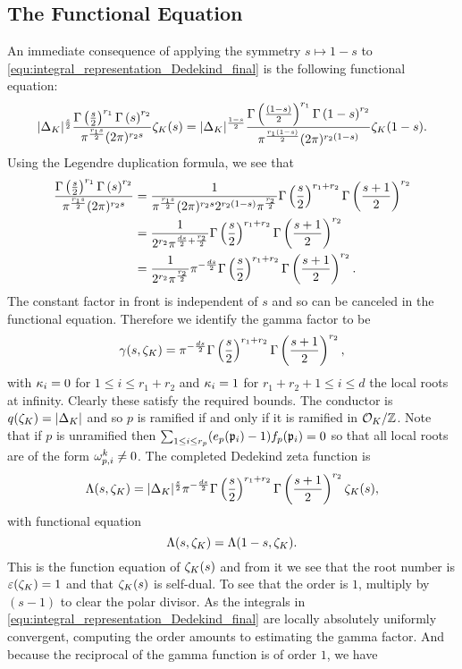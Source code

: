     \subsection*{The Functional Equation}
      An immediate consequence of applying the symmetry $s \mapsto 1-s$ to \cref{equ:integral_representation_Dedekind_final} is the following functional equation:
      \[
        |\Delta_{K}|^{\frac{s}{2}}\frac{\Gamma\left(\frac{s}{2}\right)^{r_{1}}\Gamma\left(s\right)^{r_{2}}}{\pi^{\frac{r_{1}s}{2}}(2\pi)^{r_{2}s}}\zeta_{K}(s) = |\Delta_{K}|^{\frac{1-s}{2}}\frac{\Gamma\left(\frac{(1-s)}{2}\right)^{r_{1}}\Gamma\left(1-s\right)^{r_{2}}}{\pi^{\frac{r_{1}(1-s)}{2}}(2\pi)^{r_{2}(1-s)}}\zeta_{K}(1-s).
      \]
      Using the Legendre duplication formula, we see that
      \begin{align*}
        \frac{\Gamma\left(\frac{s}{2}\right)^{r_{1}}\Gamma\left(s\right)^{r_{2}}}{\pi^{\frac{r_{1}s}{2}}(2\pi)^{r_{2}s}} &= \frac{1}{\pi^{\frac{r_{1}s}{2}}(2\pi)^{r_{2}s}2^{r_{2}(1-s)}\pi^{\frac{r_{2}}{2}}}\Gamma\left(\frac{s}{2}\right)^{r_{1}+r_{2}}\Gamma\left(\frac{s+1}{2}\right)^{r_{2}} \\
        &= \frac{1}{2^{r_{2}}\pi^{\frac{ds}{2}+\frac{r_{2}}{2}}}\Gamma\left(\frac{s}{2}\right)^{r_{1}+r_{2}}\Gamma\left(\frac{s+1}{2}\right)^{r_{2}} \\
        &= \frac{1}{2^{r_{2}}\pi^{\frac{r_{2}}{2}}}\pi^{-\frac{ds}{2}}\Gamma\left(\frac{s}{2}\right)^{r_{1}+r_{2}}\Gamma\left(\frac{s+1}{2}\right)^{r_{2}}.
      \end{align*}
      The constant factor in front is independent of $s$ and so can be canceled in the functional equation. Therefore we identify the gamma factor to be
      \[
        \gamma(s,\zeta_{K}) = \pi^{-\frac{ds}{2}}\Gamma\left(\frac{s}{2}\right)^{r_{1}+r_{2}}\Gamma\left(\frac{s+1}{2}\right)^{r_{2}},
      \]
      with $\kappa_{i} = 0$ for $1 \le i \le r_{1}+r_{2}$ and $\kappa_{i} = 1$ for $r_{1}+r_{2}+1 \le i \le d$ the local roots at infinity. Clearly these satisfy the required bounds. The conductor is $q(\zeta_{K}) = |\Delta_{K}|$ and so $p$ is ramified if and only if it is ramified in $\mathcal{O}_{K}/\mathbb{Z}$. Note that if $p$ is unramified then $\sum_{1 \le i \le r_{p}}(e_{p}(\mathfrak{p}_{i})-1)f_{p}(\mathfrak{p}_{i}) = 0$ so that all local roots are of the form $\omega_{p,i}^{k} \neq 0$. The completed Dedekind zeta function is
      \[
        \Lambda(s,\zeta_{K}) = |\Delta_{K}|^{\frac{s}{2}}\pi^{-\frac{ds}{2}}\Gamma\left(\frac{s}{2}\right)^{r_{1}+r_{2}}\Gamma\left(\frac{s+1}{2}\right)^{r_{2}}\zeta_{K}(s),
      \]
      with functional equation
      \[
        \Lambda(s,\zeta_{K}) = \Lambda(1-s,\zeta_{K}).
      \]
      This is the function equation of $\zeta_{K}(s)$ and from it we see that the root number is $\varepsilon(\zeta_{K}) = 1$ and that $\zeta_{K}(s)$ is self-dual. To see that the order is $1$, multiply by $(s-1)$ to clear the polar divisor. As the integrals in \cref{equ:integral_representation_Dedekind_final} are locally absolutely uniformly convergent, computing the order amounts to estimating the gamma factor. And because the reciprocal of the gamma function is of order $1$, we have
